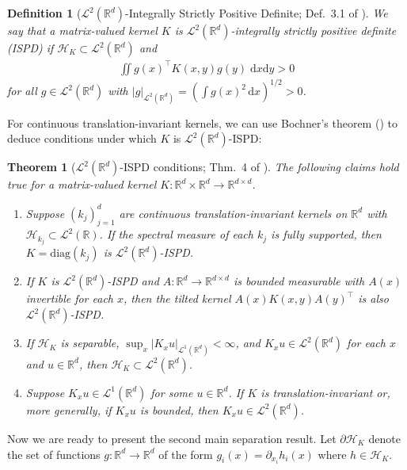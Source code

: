 \documentclass[12pt,paper=letter]{scrreprt}
\newtheorem{theorem}{Theorem}[chapter]
\newtheorem{definition}{Definition}[chapter]
\def\R{\mathbb{R}}
\renewcommand{\k}{k}
\newcommand{\Kb}{K} %
\newcommand{\dd}{\mathrm{d}}
\def\H{\mathcal{H}}
\begin{document}
\begin{definition}[$\mathcal{L}^2(\R^d)$-Integrally Strictly Positive Definite; Def.~3.1 of \citealp{liu2016kernelized}]
We say that a matrix-valued kernel $K$ is \emph{$\mathcal{L}^2(\R^d)$-integrally strictly positive definite} (ISPD) if
$\H_\Kb \subset \mathcal{L}^2(\R^d)$ and
\begin{align*}
\iint g(x)^\top K(x,y) g(y) \; \dd x \dd y > 0
\end{align*}
for all $g \in \mathcal{L}^2(\mathbb{R}^d)$ with $|g|_{\mathcal{L}^2(\mathbb{R}^d)} = (\int g(x)^2 \, \mathrm{d}x)^{1/2} > 0$.
\end{definition}

For continuous translation-invariant kernels, we can use Bochner's theorem () to deduce conditions under which $K$ is $\mathcal{L}^2(\mathbb{R}^d)$-ISPD:


\begin{theorem}[$\mathcal{L}^2(\mathbb{R}^d)$-ISPD conditions; Thm.~4 of \citealp{barp2022targeted}]
\label{thm:L2 characteristic kernels}
The following claims hold true for a matrix-valued kernel $\Kb : \mathbb{R}^d \times \mathbb{R}^d \rightarrow \mathbb{R}^{d \times d}$.
\begin{enumerate}[label=\textup{(\alph*)}]
\item Suppose $(\k_j)_{j=1}^d$ are continuous translation-invariant kernels on $\mathbb{R}^d$ with $\H_{\k_j} \subset \mathcal{L}^2(\mathbb{R})$.
If the  spectral measure of each $\k_j$ is fully supported, then $\Kb=\mathrm{diag}(\k_j)$ is $\mathcal{L}^2(\R^d)$-ISPD.
\item If $K$ is $\mathcal{L}^2(\R^d)$-ISPD and $A: \R^d \to \R^{d\times d}$ is bounded measurable with $A(x)$ invertible for each $x$, then the tilted kernel $A(x)K(x,y)A(y)^\top$ is also  $\mathcal{L}^2(\R^d)$-ISPD.
\item  If $\H_\Kb$ is separable,  $\sup_x | \Kb_x u |_{\mathcal{L}^1(\mathbb{R}^d)}<\infty$, and $\Kb_x u \in \mathcal{L}^2(\R^d)$ for each $x$ and $u\in \R^d$, then $\H_K \subset \mathcal{L}^2(\R^d)$.
\item Suppose $\Kb_x u\in\mathcal{L}^1(\R^d)$ for some $u \in \R^d$.
If $\Kb$ is translation-invariant or, more generally, if $\Kb_x u$ is bounded, then $\Kb_x u\in\mathcal{L}^2(\R^d)$. 
\end{enumerate}
\end{theorem}

Now we are ready to present the second main separation result.
Let $\partial \mathcal{H}_K$ denote the set of functions $g : \mathbb{R}^d \rightarrow \mathbb{R}^d$ of the form $g_i(x) = \partial_{x_i} h_i(x)$ where $h \in \mathcal{H}_K$.
\end{document}
